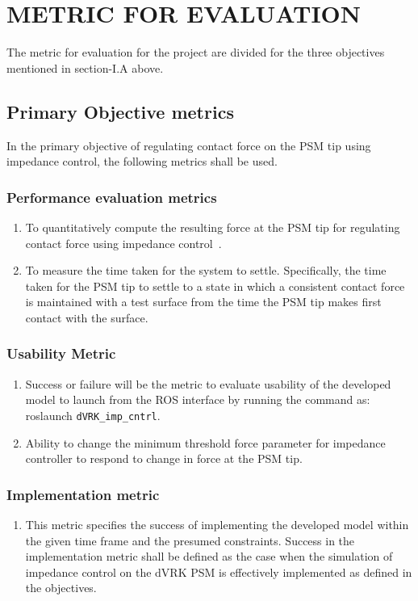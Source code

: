 \documentclass[10pt,journal,compsoc]{IEEEtran}
\begin{document}
\section{METRIC FOR EVALUATION}
The metric for evaluation for the project are divided for the three objectives mentioned in section-I.A above.

\subsection{Primary Objective metrics}
In the primary objective of regulating contact force on the PSM tip using impedance control, the following metrics shall be used. 
\subsubsection{Performance evaluation metrics}
			\begin{enumerate}
				\item To quantitatively compute the resulting force at the PSM tip for regulating contact force using impedance control~\cite{hogan1984}.
				\item To measure the time taken for the system to settle. Specifically, the time taken for the PSM tip to settle to a state in which a consistent contact force is maintained with a test surface from the time the PSM tip makes first contact with the surface.
			\end{enumerate}
\subsubsection{Usability Metric}
			\begin{enumerate}
				\item Success or failure will be the metric to evaluate usability of the developed model to launch from the ROS interface by running the command as: roslaunch \texttt{dVRK\_imp\_cntrl}.
				\item Ability to change the minimum threshold force parameter for impedance controller to respond to change in force at the PSM tip. 
			\end{enumerate}
\subsubsection{Implementation metric}
			\begin{enumerate}
				\item This metric specifies the success of implementing the developed model within the given time frame and the presumed constraints. Success in the implementation metric shall be defined as the case when the simulation of impedance control on the dVRK PSM is effectively implemented as defined in the objectives.
			\end{enumerate}
	
\end{document}

